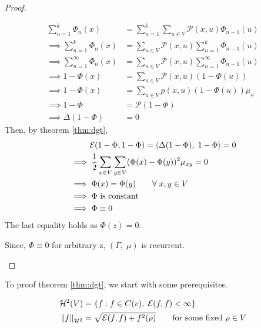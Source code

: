 \documentclass[main]{subfiles}
\begin{document}
\begin{lemma}
\begin{proof}
\begin{enumerate}
                  \begin{align*}
                      \sum_{n=1}^k\Phi_n(x)               & = \sum_{n=1}^k\sum_{u \in V}\mathcal{P}(x, u)\Phi_{n-1}(u)      \\
                      \implies \sum_{n=1}^k\Phi_n(x)      & = \sum_{u \in V}\mathcal{P}(x, u)\sum_{n=1}^k\Phi_{n-1}(u)      \\
                      \implies \sum_{n=1}^\infty\Phi_n(x) & = \sum_{u \in V}\mathcal{P}(x, u)\sum_{n=1}^\infty\Phi_{n-1}(u) \\
                      \implies 1 - \Phi(x)                & = \sum_{u \in V}\mathcal{P}(x, u)(1 - \Phi(u))                  \\
                      \implies 1 - \Phi(x)                & = \sum_{u \in V}p(x, u)(1 - \Phi(u))\mu_u                       \\
                      \implies 1 - \Phi                   & = \mathcal{P}(1 - \Phi )                                        \\
                      \implies \Delta(1 - \Phi)           & = 0
                  \end{align*}
                  Then, by theorem \eqref{thm:dgt},
                  \begin{align*}
                       & \hspace{2.5em}\mathcal{E}(1-\Phi,1-\Phi) = \left\langle\Delta(1 - \Phi),\;1 - \Phi\right\rangle = 0  \\
                       & \implies \frac{1}{2}\sum_{x \in V}\sum_{y \in V}(\Phi(x)-\Phi(y))^2\mu_{xy} = 0 \\
                       & \implies \Phi(x) = \Phi(y) \hspace{2em} \forall\;x,y \in V                      \\
                       & \implies \Phi\text{ is constant}                                                \\
                       & \implies \Phi \equiv 0
                  \end{align*}
                  The last equality holds as $\Phi(z) = 0$.

                  Since, $\Phi \equiv 0$ for arbitrary z, $(\Gamma,\;\mu)$ is recurrent.
        \end{enumerate}
    \end{proof}
\end{lemma}
To proof theorem \eqref{thm:dgt}, we start with some prerequisites.
\begin{definition}
    \begin{align*}
        \mathcal{H}^2(V)        & = \{f: f \in C(v),\; \mathcal{E}(f, f) < \infty\}                                    \\
        \left\lVert f\right\rVert_{\mathcal{H}^2} & = \sqrt{\mathcal{E}(f, f) + f^2(\rho)} \hspace{2em} \text{for some fixed }\rho \in V
    \end{align*}
\end{definition}
\end{document}
